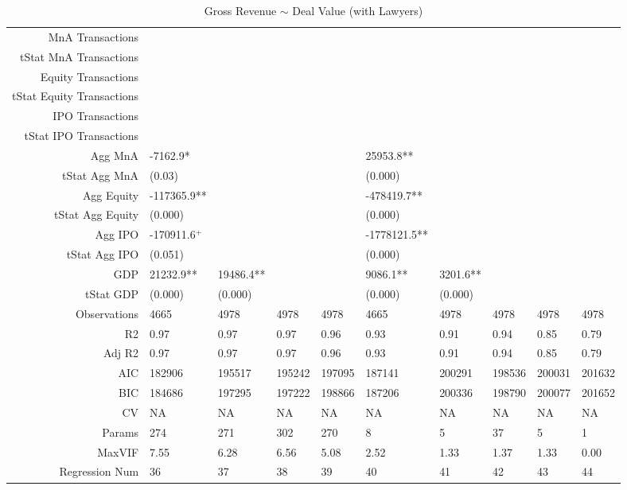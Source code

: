 \begin{table}[ht]
\begin{tabular}{rlllllllll}
  MnA Transactions &  &  &  &  &  &  &  &  &  \\ 
  tStat MnA Transactions &  &  &  &  &  &  &  &  &  \\ 
  Equity Transactions &  &  &  &  &  &  &  &  &  \\ 
  tStat Equity Transactions &  &  &  &  &  &  &  &  &  \\ 
  IPO Transactions &  &  &  &  &  &  &  &  &  \\ 
  tStat IPO Transactions &  &  &  &  &  &  &  &  &  \\ 
  Agg MnA & -7162.9* &  &  &  & 25953.8** &  &  &  &  \\ 
  tStat Agg MnA & (0.03) &  &  &  & (0.000) &  &  &  &  \\ 
  Agg Equity & -117365.9** &  &  &  & -478419.7** &  &  &  &  \\ 
  tStat Agg Equity & (0.000) &  &  &  & (0.000) &  &  &  &  \\ 
  Agg IPO & -170911.6$^{+}$ &  &  &  & -1778121.5** &  &  &  &  \\ 
  tStat Agg IPO & (0.051) &  &  &  & (0.000) &  &  &  &  \\ 
  GDP & 21232.9** & 19486.4** &  &  & 9086.1** & 3201.6** &  &  &  \\ 
  tStat GDP & (0.000) & (0.000) &  &  & (0.000) & (0.000) &  &  &  \\ 
  Observations & 4665 & 4978 & 4978 & 4978 & 4665 & 4978 & 4978 & 4978 & 4978 \\ 
  R2 & 0.97 & 0.97 & 0.97 & 0.96 & 0.93 & 0.91 & 0.94 & 0.85 & 0.79 \\ 
  Adj R2 & 0.97 & 0.97 & 0.97 & 0.96 & 0.93 & 0.91 & 0.94 & 0.85 & 0.79 \\ 
  AIC & 182906 & 195517 & 195242 & 197095 & 187141 & 200291 & 198536 & 200031 & 201632 \\ 
  BIC & 184686 & 197295 & 197222 & 198866 & 187206 & 200336 & 198790 & 200077 & 201652 \\ 
  CV & NA & NA & NA & NA & NA & NA & NA & NA & NA \\ 
  Params & 274 & 271 & 302 & 270 & 8 & 5 & 37 & 5 & 1 \\ 
  MaxVIF & 7.55 & 6.28 & 6.56 & 5.08 & 2.52 & 1.33 & 1.37 & 1.33 & 0.00 \\ 
  Regression Num & 36 & 37 & 38 & 39 & 40 & 41 & 42 & 43 & 44 \\ 
   \hline
\end{tabular}
\caption{Gross Revenue $\sim$ Deal Value (with Lawyers)} 
\end{table}
